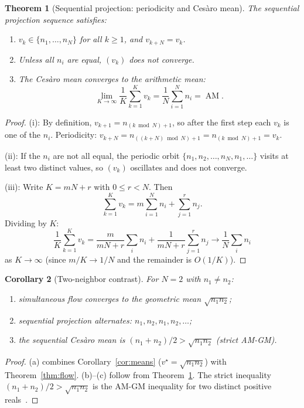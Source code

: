 \documentclass[11pt]{amsart}
\newtheorem{theorem}{Theorem}[section]
\newtheorem{corollary}[theorem]{Corollary}
\theoremstyle{definition}
\theoremstyle{remark}
\begin{document}
\begin{theorem}[Sequential projection: periodicity and Ces\`aro mean]
\label{thm:sequential}
The sequential projection sequence satisfies:
\begin{enumerate}[label=\textup{(\roman*)},nosep]
\item $v_k\in\{n_1,\dots,n_N\}$ for all $k\ge1$, and $v_{k+N}=v_k$.
\item Unless all $n_i$ are equal, $(v_k)$ does not converge.
\item The Ces\`aro mean converges to the arithmetic mean:
\[
\lim_{K\to\infty}\frac1K\sum_{k=1}^K v_k
=\frac1N\sum_{i=1}^N n_i=\operatorname{AM}.
\]
\end{enumerate}
\end{theorem}
\begin{proof}
(i): By definition, $v_{k+1}=n_{(k\bmod N)+1}$, so after the first step
each $v_k$ is one of the $n_i$.  Periodicity: $v_{k+N}=n_{((k+N)\bmod N)+1}
=n_{(k\bmod N)+1}=v_k$.

(ii): If the $n_i$ are not all equal, the periodic orbit
$\{n_1,n_2,\dots,n_N,n_1,\dots\}$ visits at least two distinct values,
so $(v_k)$ oscillates and does not converge.

(iii): Write $K=mN+r$ with $0\le r<N$.  Then
\[
\sum_{k=1}^{K}v_k=m\sum_{i=1}^N n_i+\sum_{j=1}^r n_j.
\]
Dividing by $K$:
\[
\frac1K\sum_{k=1}^K v_k
=\frac{m}{mN+r}\sum_i n_i+\frac{1}{mN+r}\sum_{j=1}^r n_j
\to\frac1N\sum_i n_i
\]
as $K\to\infty$ (since $m/K\to1/N$ and the remainder is $O(1/K)$).
\end{proof}

\begin{corollary}[Two-neighbor contrast]\label{cor:contrast}
For $N=2$ with $n_1\neq n_2$:
\begin{enumerate}[label=\textup{(\alph*)},nosep]
\item simultaneous flow converges to the geometric mean $\sqrt{n_1n_2}$;
\item sequential projection alternates: $n_1,n_2,n_1,n_2,\dots$;
\item the sequential Ces\`aro mean is
  $(n_1+n_2)/2>\sqrt{n_1n_2}$ (strict AM-GM).
\end{enumerate}
\end{corollary}
\begin{proof}
(a) combines Corollary~\ref{cor:means} ($v^\star=\sqrt{n_1n_2}$) with
Theorem~\ref{thm:flow}.
(b)--(c) follow from Theorem~\ref{thm:sequential}.
The strict inequality $(n_1+n_2)/2>\sqrt{n_1n_2}$ is the AM-GM
inequality for two distinct positive reals~\cite[Theorem~9]{HardyLittlewoodPolya}.
\end{proof}
\end{document}
